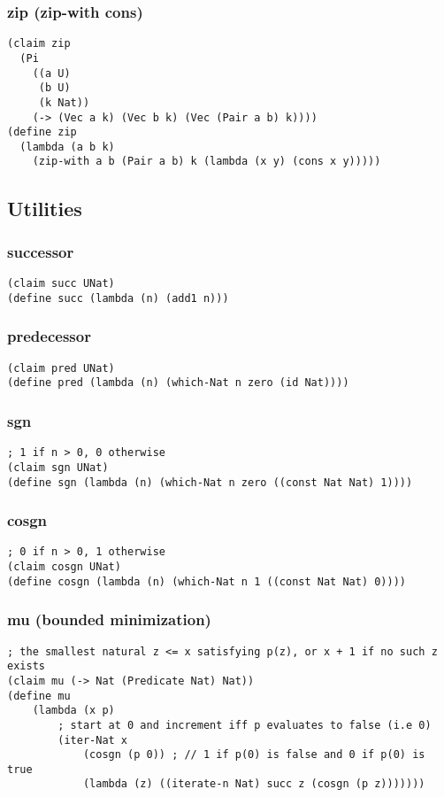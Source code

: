 \subsubsection{zip (zip-with cons)} \label{code:zip}
\begin{verbatim}
(claim zip
  (Pi
    ((a U)
     (b U)
     (k Nat))
    (-> (Vec a k) (Vec b k) (Vec (Pair a b) k))))
(define zip
  (lambda (a b k)
    (zip-with a b (Pair a b) k (lambda (x y) (cons x y)))))
\end{verbatim}


\subsection{Utilities}

\subsubsection{successor} \label{code:successor}
\begin{verbatim}
(claim succ UNat)
(define succ (lambda (n) (add1 n)))
\end{verbatim}

\subsubsection{predecessor} \label{code:predecessor}
\begin{verbatim}
(claim pred UNat)
(define pred (lambda (n) (which-Nat n zero (id Nat))))
\end{verbatim}

\subsubsection{sgn} \label{code:sgn}
\begin{verbatim}
; 1 if n > 0, 0 otherwise
(claim sgn UNat)
(define sgn (lambda (n) (which-Nat n zero ((const Nat Nat) 1))))
\end{verbatim}

\subsubsection{cosgn} \label{code:cosgn}
\begin{verbatim}
; 0 if n > 0, 1 otherwise
(claim cosgn UNat)
(define cosgn (lambda (n) (which-Nat n 1 ((const Nat Nat) 0))))
\end{verbatim}

\subsubsection{mu (bounded minimization)} \label{code:mu}
\begin{verbatim}
; the smallest natural z <= x satisfying p(z), or x + 1 if no such z exists
(claim mu (-> Nat (Predicate Nat) Nat))
(define mu
    (lambda (x p)
        ; start at 0 and increment iff p evaluates to false (i.e 0)
        (iter-Nat x 
            (cosgn (p 0)) ; // 1 if p(0) is false and 0 if p(0) is true
            (lambda (z) ((iterate-n Nat) succ z (cosgn (p z)))))))
\end{verbatim}


